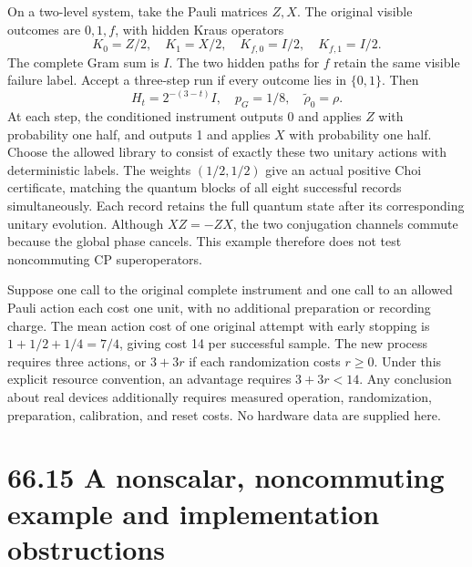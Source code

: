 \documentclass[
  11pt,
  oneside]{book}
\begin{document}
On a two-level system, take the Pauli matrices \(Z,X\). The original
visible outcomes are \(0,1,f\), with hidden Kraus operators \[
K_0=Z/2,\quad K_1=X/2,\quad
K_{f,0}=I/2,\quad K_{f,1}=I/2.
\] The complete Gram sum is \(I\). The two hidden paths for \(f\) retain
the same visible failure label. Accept a three-step run if every outcome
lies in \(\{0,1\}\). Then \[
H_t=2^{-(3-t)}I,\quad p_G=1/8,\quad\widetilde\rho_0=\rho.
\] At each step, the conditioned instrument outputs 0 and applies \(Z\)
with probability one half, and outputs 1 and applies \(X\) with
probability one half. Choose the allowed library to consist of exactly
these two unitary actions with deterministic labels. The weights
\((1/2,1/2)\) give an actual positive Choi certificate, matching the
quantum blocks of all eight successful records simultaneously. Each
record retains the full quantum state after its corresponding unitary
evolution. Although \(XZ=-ZX\), the two conjugation channels commute
because the global phase cancels. This example therefore does not test
noncommuting CP superoperators.

Suppose one call to the original complete instrument and one call to an
allowed Pauli action each cost one unit, with no additional preparation
or recording charge. The mean action cost of one original attempt with
early stopping is \(1+1/2+1/4=7/4\), giving cost 14 per successful
sample. The new process requires three actions, or \(3+3r\) if each
randomization costs \(r\ge0\). Under this explicit resource convention,
an advantage requires \(3+3r<14\). Any conclusion about real devices
additionally requires measured operation, randomization, preparation,
calibration, and reset costs. No hardware data are supplied here.

\section{66.15 A nonscalar, noncommuting example and implementation
obstructions}
\end{document}
